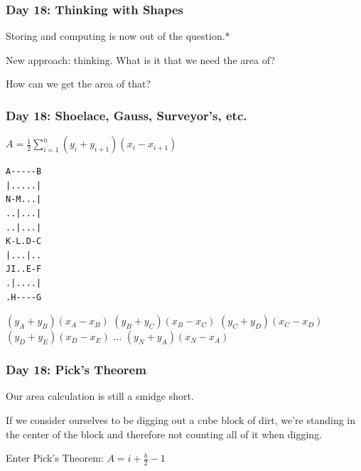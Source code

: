 \begin{frame}
\frametitle{Day 18: Thinking with Shapes}

Storing and computing is now out of the question.*\vfill

New approach: thinking. What is it that we need the area of?\vfill

How can we get the area of that?\vfill

\end{frame}

\begin{frame}[fragile]
\frametitle{Day 18: Shoelace, Gauss, Surveyor's, etc.}

\begin{center}
$A = \frac{1}{2}\sum_{i=1}^{n}(y_i + y_{i+1})(x_i - x_{i+1})$\vfill
\end{center}

\begin{center}

\begin{minipage}{0.3\textwidth}
\begin{center}
\begin{verbatim}
A-----B
|.....|
N-M...|
..|...|
..|...|
K-L.D-C
|...|..
JI..E-F
.|....|
.H----G
\end{verbatim}
\end{center}
\end{minipage}
\begin{minipage}{0.3\textwidth}
\begin{center}
$(y_{A} + y_{B})(x_{A} - x_{B})$
$(y_{B} + y_{C})(x_{B} - x_{C})$
$(y_{C} + y_{D})(x_{C} - x_{D})$
$(y_{D} + y_{E})(x_{D} - x_{E})$
...
$(y_{N} + y_{A})(x_{N} - x_{A})$
\end{center}
\end{minipage}

\end{center}
\vfill

\end{frame}

\begin{frame}
\frametitle{Day 18: Pick's Theorem}

Our area calculation is still a smidge short.\vfill

If we consider ourselves to be digging out a cube block of dirt, we're standing in the center of the block and therefore not counting all of it when digging.\vfill

Enter Pick's Theorem: $A = i + \frac{b}{2} - 1$

\end{frame}

